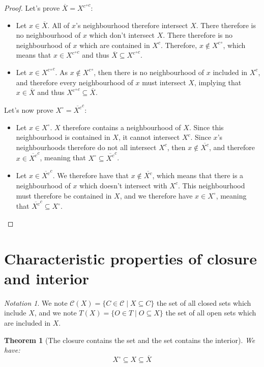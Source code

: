 \documentclass{article}
\newtheorem{theorem}{Theorem}[section]
\theoremstyle{definition}
\theoremstyle{remark}
\theoremstyle{example}
\theoremstyle{notation}
\newtheorem{notation}{Notation}[section]
\newcommand{\inter}[1]{{{#1}^\circ}}
\newcommand{\adher}[1]{{\overline{#1}}}
\newcommand{\closed}{\mathcal{C}}
\begin{document}
\begin{proof}
		Let's prove $\adher{X} = \inter{X^c}^c$:
		\begin{itemize}
				\item Let $x \in \adher{X}$. All of $x$'s neighbourhood therefore intersect $X$. There therefore is no neighbourhood of $x$ which don't intersect $X$. There therefore is no neighbourhood of $x$ which are contained in $X^c$. Therefore, $x \notin \inter{X^c}$, which means that $x \in \inter{X^c}^c$ and thus $\adher{X} \subseteq \inter{X^c}^c$.
				\item Let $x \in \inter{X^c}^c$. As $x \notin \inter{X^c}$, then there is no neighbourhood of $x$ included in $X^c$, and therefore every neighbourhood of $x$ must intersect $X$, implying that $x \in \adher{X}$ and thus $\inter{X^c}^c \subseteq \adher{X}$.
		\end{itemize}
		Let's now prove $\inter{X} = \adher{X^c}^c$:
		\begin{itemize}
				\item Let $x \in \inter{X}$. $X$ therefore contains a neighbourhood of $X$. Since this neighbourhood is contained in $X$, it cannot intersect $X^c$. Since $x$'s neighbourhoods therefore do not all intersect $X^c$, then $x \notin \adher{X^c}$, and therefore $x \in \adher{X^c}^c$, meaning that $\inter{X} \subseteq \adher{X^c}^c$.
				\item Let $x \in \adher{X^c}^c$. We therefore have that $x \notin \adher{X^c}$, which means that there is a neighbourhood of $x$ which doesn't intersect with $X^c$. This neighbourhood must therefore be contained in $X$, and we therefore have $x \in \inter{X}$, meaning that $\adher{X^c}^c \subseteq \inter{X}$.
		\end{itemize}
\end{proof}

\section{Characteristic properties of closure and interior}

\begin{notation}
		We note $\closed(X) = \{C \in \closed \mid X \subseteq C\}$ the set of all closed sets which include $X$, and we note $T(X) = \{O \in T \mid O \subseteq X\}$ the set of all open sets which are included in $X$.
\end{notation}

\begin{theorem}[The closure contains the set and the set contains the interior] \label{thm:interior-in-set-in-closure}
		We have:
				$$\inter{X} \subseteq X \subseteq \adher{X}$$
\end{theorem}
\end{document}
